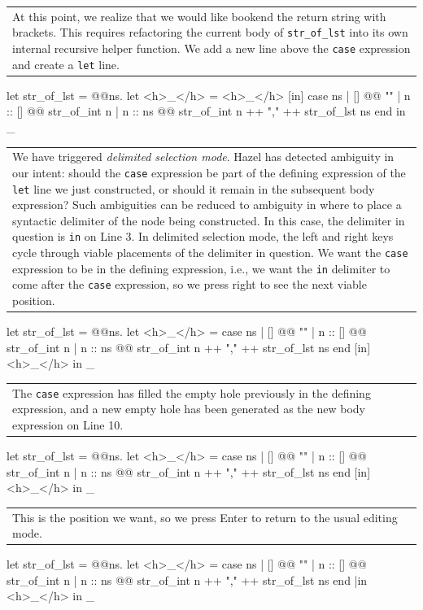 \documentclass[runningheads]{llncs}
\newcommand{\Hazel}{\textsf{Hazel}\xspace}
\begin{document}
	\begin{tabular}{|p{\linewidth}}
	At this point, we realize that we would like bookend the return string
	with brackets. This requires refactoring the current body of
	\texttt{str\_of\_lst} into its own internal recursive helper function.
	We add a new line above the \texttt{case} expression and create a
	\texttt{let} line.
	\end{tabular}
\begin{hazel}
let str_of_lst = 
	@\lam @ns.{
		let <h>_</h> = <h>_</h> [in]
		case ns
		| []      @\casearrow @ ""
		| n :: [] @\casearrow @ str_of_int n		
		| n :: ns @\casearrow @ str_of_int n ++ "," ++ str_of_lst ns
		end
	}
in
_
\end{hazel}
	\begin{tabular}{|p{\linewidth}}
	We have triggered \emph{delimited selection mode}. \Hazel has detected
	ambiguity in our intent: should the \texttt{case} expression be part of
	the defining expression of the \texttt{let} line we just constructed,
	or should it remain in the subsequent body expression? Such ambiguities
	can be reduced to ambiguity in where to place a syntactic delimiter
	of the node being constructed. In this case, the delimiter in question is
	\texttt{in} on Line 3. In delimited selection mode, the left and right
	keys cycle through viable placements of the delimiter in question.
	We want the \texttt{case} expression to be in the defining expression,
	i.e., we want the \texttt{in} delimiter to come after the \texttt{case}
	expression, so we press right to see the next viable position.
	\end{tabular}
\begin{hazel}
let str_of_lst = 
	@\lam @ns.{
		let <h>_</h> =
			case ns
			| []      @\casearrow @ ""
			| n :: [] @\casearrow @ str_of_int n		
			| n :: ns @\casearrow @ str_of_int n ++ "," ++ str_of_lst ns
			end
		[in]
		<h>_</h>
	}
in
_
\end{hazel}
	\begin{tabular}{|p{\linewidth}}
	The \texttt{case} expression has filled the empty hole previously in 
	the defining expression, and a new empty hole has been generated as the
	new body expression on Line 10.
	\end{tabular}
\begin{hazel}
let str_of_lst = 
	@\lam @ns.{
		let <h>_</h> =
			case ns
			| []      @\casearrow @ ""
			| n :: [] @\casearrow @ str_of_int n		
			| n :: ns @\casearrow @ str_of_int n ++ "," ++ str_of_lst ns
			end
		[in]
		<h>_</h>
	}
in
_
\end{hazel}
	\begin{tabular}{|p{\linewidth}}
	This is the position we want, so we press Enter to return to
	the usual editing mode.
	\end{tabular}
\begin{hazel}
let str_of_lst = 
	@\lam @ns.{
		let <h>_</h> =
			case ns
			| []      @\casearrow @ ""
			| n :: [] @\casearrow @ str_of_int n		
			| n :: ns @\casearrow @ str_of_int n ++ "," ++ str_of_lst ns
			end
		|in
		<h>_</h>
	}
in
_
\end{hazel}
\end{document}
